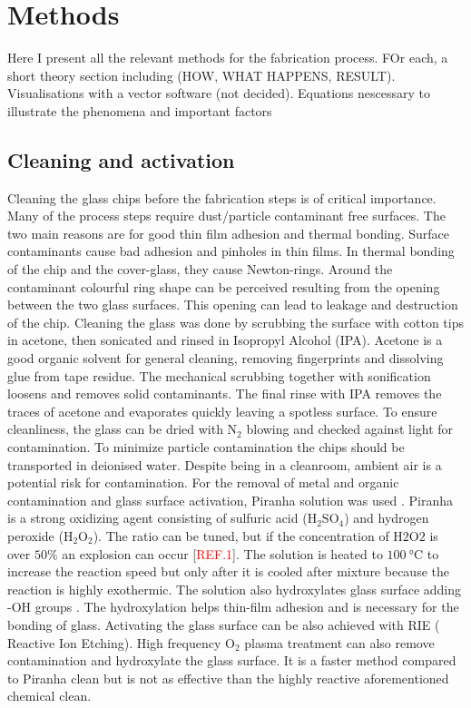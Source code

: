 \documentclass[draft]{jyflluk}
\begin{document}


\section{Methods}
\label{sec:methods}

Here I present all the relevant methods for the fabrication process. FOr each, a short theory section including (HOW, WHAT HAPPENS, RESULT). Visualisations with a vector software (not decided). Equations  nescessary to illustrate the phenomena and important factors

\subsection{Cleaning and activation}
\label{sec:xx1}

Cleaning the glass chips before the fabrication steps is of critical importance. Many of the process steps require dust/particle contaminant free surfaces. The two main reasons are for good thin film adhesion and thermal bonding. Surface contaminants cause bad adhesion and pinholes in thin films. In thermal bonding of the chip and the cover-glass, they cause Newton-rings. Around the contaminant colourful ring shape can be perceived resulting from the opening between the two glass surfaces. This opening can lead to leakage and destruction of the chip.
Cleaning the glass was done by scrubbing the surface with cotton tips in acetone, then sonicated and rinsed in Isopropyl Alcohol (IPA). Acetone is a good organic solvent for general cleaning, removing fingerprints and dissolving glue from tape residue. The mechanical scrubbing together with sonification loosens and removes solid contaminants. The final rinse with IPA removes the traces of acetone and evaporates quickly leaving a spotless surface. To ensure cleanliness, the glass can be dried with $\mathrm{N_2}$ blowing and checked against light for contamination.  To minimize particle contamination the chips should be transported in deionised water. Despite being in a cleanroom, ambient air is a potential risk for contamination. 
For the removal of metal and organic contamination and glass surface activation, Piranha solution was used \cite{franssila2010introduction}. Piranha is a strong oxidizing agent consisting of sulfuric acid ($\mathrm{H_2 SO_4}$) and hydrogen peroxide ($\mathrm{H_2 O_2}$). The ratio can be tuned, but if the concentration of $\mathrm{H2O2}$ is over $50 \percent$ an explosion can occur [\textcolor{red}{REF.1}]. The solution is heated to $\SI{100}{\celsius}$ to increase the reaction speed but only after it is cooled after mixture because the reaction is highly exothermic. The solution also hydroxylates glass surface adding -OH groups \cite{klug2013chemical}. The hydroxylation helps thin-film adhesion and is necessary for the bonding of glass. Activating the glass surface can be also achieved with RIE ( Reactive Ion Etching)\cite{lazauskas2012float}. High frequency $\mathrm{O_2}$ plasma treatment can also remove contamination and  hydroxylate the glass surface. It is a faster method compared to Piranha clean but is not as effective than the highly reactive aforementioned chemical clean.
\end{document}
